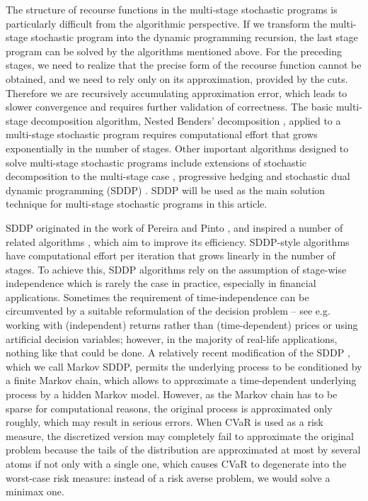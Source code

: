 \documentclass{article}              %
\begin{document}
The structure of recourse functions in the multi-stage stochastic programs is particularly difficult from the algorithmic perspective. If we transform the multi-stage stochastic program into the dynamic programming recursion, the last stage program can be solved by the algorithms mentioned above. For the preceding stages, we need to realize that the precise form of the recourse function cannot be obtained, and we need to rely only on its approximation, provided by the cuts. Therefore we are recursively accumulating approximation error, which leads to slower convergence and requires further validation of correctness. The basic multi-stage decomposition algorithm, Nested Benders' decomposition  \cite{birge_85}, applied to a multi-stage stochastic program requires computational effort that grows exponentially  in the number of stages. Other important algorithms designed to solve multi-stage stochastic programs include extensions of stochastic decomposition to the multi-stage case \cite{stochdecomp,sen_zhou_2012}, progressive hedging \cite{rockafellar_wets_91} and stochastic dual dynamic programming (SDDP) \cite{pereirapinto}. SDDP will be used as the main solution technique for multi-stage stochastic programs in this article.

SDDP originated in the work of Pereira and Pinto \cite{pereirapinto}, and inspired a number of related algorithms \cite{chen_powell_99,donohue_birge_06,linowsky_philpott_05,philpott_guan_08}, which aim to improve its efficiency. SDDP-style algorithms have computational effort per iteration that grows linearly in the number of stages. To achieve this, SDDP algorithms rely on the assumption of stage-wise independence which is rarely
the case in practice, especially in financial applications. Sometimes
the requirement of time-independence can be circumvented by a suitable
reformulation of the decision problem -- see e.g. \cite{kozmik2014evaluating}
working with (independent) returns rather than (time-dependent) prices or \cite{lohndorf2019modeling} using artificial decision variables;
however, in the majority of real-life applications, nothing like that
could be done. A relatively recent modification of the SDDP
\cite{philpott2013solving}, which we call Markov SDDP, permits the
underlying process to be conditioned by a finite Markov chain, which 
allows to approximate a time-dependent underlying process by a hidden
Markov model. However, as the Markov chain has to be sparse for computational
reasons, the original process is approximated only
roughly, which may result in serious errors. When CVaR is used as a risk measure, the discretized version may completely fail to approximate the original problem because the tails of the distribution are approximated at most by several atoms if not only with a single one, which causes CVaR to degenerate into the worst-case risk measure: instead of a risk averse problem, we would solve a minimax one. 
\end{document}
